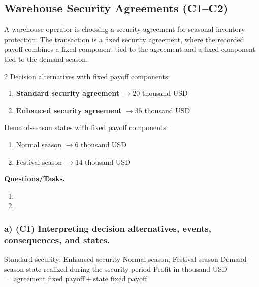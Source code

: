 	\subsection{Warehouse Security Agreements (C1--C2)}
	\label{sec:problem17-warehouse-security-agreements-c1-c2}
	A warehouse operator is choosing a security agreement for seasonal inventory protection. The transaction is a fixed security agreement, where the recorded payoff combines a fixed component tied to the agreement and a fixed component tied to the demand season.
	
	\begin{multicols}{2}
		Decision alternatives with fixed payoff components:
		\begin{enumerate}[label=\arabic*.]
			\item \textbf{Standard security agreement} $\to 20$ thousand USD
			\item \textbf{Enhanced security agreement} $\to 35$ thousand USD
		\end{enumerate}
	
			\columnbreak
	
		Demand-season states with fixed payoff components:
		\begin{enumerate}[label=\arabic*.]
			\item Normal season $\to 6$ thousand USD
			\item Festival season $\to 14$ thousand USD
		\end{enumerate}
	\end{multicols}

	\textbf{Questions/Tasks.}
	\begin{enumerate}[label=\textbf{\alph*)}]
		\item {}
		\item {}
	\end{enumerate}
	
	\subsubsection*{a) \textbf{(C1)} Interpreting decision alternatives, events, consequences, and states.}
	\label{subsec:problem17-warehouse-security-agreements-c1}
	\DecisionElementsTable
	{Standard security; Enhanced security}
	{Normal season; Festival season}
	{Demand-season state realized during the security period}
	{Profit in thousand USD $= \text{agreement fixed payoff} + \text{state fixed payoff}$}
	
